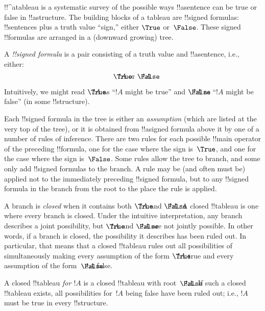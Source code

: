 \documentclass[../../../include/open-logic-section]{subfiles}
\begin{document}
      {}
      {}


!!^a{tableau} is a systematic survey of the possible ways
!!a{sentence} can be true or false in !!a{structure}. The building
blocks of a tableau are !!{signed formula}s: !!{sentence}s plus a
truth value ``sign,'' either $\True$ or~$\False$. These signed
!!{formula}s are arranged in a (downward growing) tree.

\begin{defn}
  A \emph{!!{signed formula}} is a pair consisting of a truth value
  and !!a{sentence}, i.e., either:
  \[
  \sFmla{\True}{!A} \text{ or } \sFmla{\False}{!A}.
  \]
\end{defn}

Intuitively, we might read $\sFmla{\True}{!A}$ as ``$!A$ might be
true'' and $\sFmla{\False}{!A}$ as ``$!A$ might be false'' (in some
!!{structure}).

Each !!{signed formula} in the tree is either an \emph{assumption}
(which are listed at the very top of the tree), or it is obtained from
!!a{signed formula} above it by one of a number of rules of
inference. There are two rules for each possible !!{main operator} of
the preceding !!{formula}, one for the case where the sign is~$\True$,
and one for the case where the sign is~$\False$. Some rules allow the
tree to branch, and some only add !!{signed formula}s to the branch.
A rule may be (and often must be) applied not to the immediately
preceding !!{signed formula}, but to any !!{signed formula} in the
branch from the root to the place the rule is applied.

A branch is \emph{closed} when it contains both $\sFmla{\True}{!A}$
and $\sFmla{\False}{!A}$. A closed !!{tableau} is one where every branch
is closed.  Under the intuitive interpretation, any branch describes a
joint possibility, but $\sFmla{\True}{!A}$ and $\sFmla{\False}{!A}$
are not jointly possible. In other words, if a branch is closed, the
possibility it describes has been ruled out. In particular, that means
that a closed !!{tableau} rules out all possibilities of simultaneously
making every assumption of the form $\sFmla{\True}{!A}$ true and every
assumption of the form~$\sFmla{\False}{!A}$ false.

A closed !!{tableau} \emph{for $!A$} is a closed !!{tableau} with
root~$\sFmla{\False}{!A}$. If such a closed !!{tableau} exists, all
possibilities for~$!A$ being false have been ruled out; i.e., $!A$
must be true in every !!{structure}.
\end{document}

